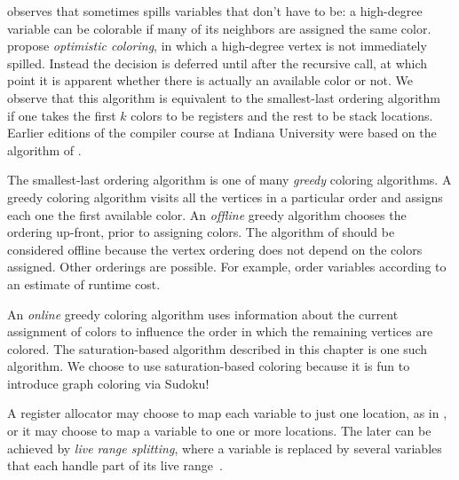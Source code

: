 \documentclass[7x10]{TimesAPriori_MIT}%
\begin{document}
\citet{Briggs:1994kx} observes that \citet{Chaitin:1982vn} sometimes
spills variables that don't have to be: a high-degree variable can be
colorable if many of its neighbors are assigned the same color.
\citet{Briggs:1994kx} propose \emph{optimistic coloring}, in which a
high-degree vertex is not immediately spilled. Instead the decision is
deferred until after the recursive call, at which point it is apparent
whether there is actually an available color or not. We observe that
this algorithm is equivalent to the smallest-last ordering
algorithm~\citep{Matula:1972aa} if one takes the first $k$ colors to
be registers and the rest to be stack locations.
Earlier editions of the compiler course at Indiana University
\citep{Dybvig:2010aa} were based on the algorithm of
\citet{Briggs:1994kx}.

The smallest-last ordering algorithm is one of many \emph{greedy}
coloring algorithms. A greedy coloring algorithm visits all the
vertices in a particular order and assigns each one the first
available color. An \emph{offline} greedy algorithm chooses the
ordering up-front, prior to assigning colors. The algorithm of
\citet{Chaitin:1981vl} should be considered offline because the vertex
ordering does not depend on the colors assigned.  Other orderings are
possible. For example, \citet{Chow:1984ys} order variables according
to an estimate of runtime cost.

An \emph{online} greedy coloring algorithm uses information about the
current assignment of colors to influence the order in which the
remaining vertices are colored. The saturation-based algorithm
described in this chapter is one such algorithm. We choose to use
saturation-based coloring because it is fun to introduce graph
coloring via Sudoku!

A register allocator may choose to map each variable to just one
location, as in \citet{Chaitin:1981vl}, or it may choose to map a
variable to one or more locations. The later can be achieved by
\emph{live range splitting}, where a variable is replaced by several
variables that each handle part of its live
range~\citep{Chow:1984ys,Briggs:1994kx,Cooper:1998ly}.



\end{document}
